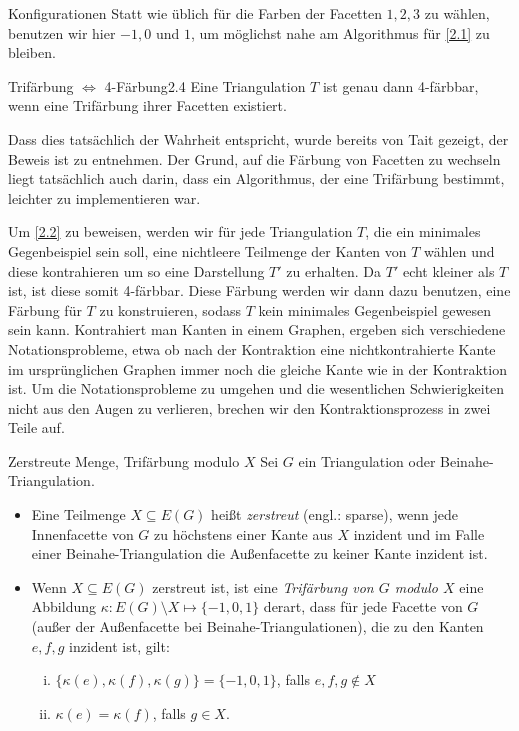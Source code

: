 \begin{section}{Konfigurationen}
 Statt wie üblich für die Farben der Facetten $1,2,3$ zu wählen, benutzen wir hier $-1,0$ und $1$, um möglichst nahe am Algorithmus für \ref{2.1} zu bleiben.
 
 \begin{satzl}{Trifärbung $\Leftrightarrow$ 4-Färbung}{2.4}
  Eine Triangulation $T$ ist genau dann 4-färbbar, wenn eine Trifärbung ihrer Facetten existiert.
 \end{satzl}
 
 Dass dies tatsächlich der Wahrheit entspricht, wurde bereits von Tait gezeigt, der Beweis ist \cite{TaitTri} zu entnehmen. Der Grund, auf die Färbung von Facetten zu wechseln liegt tatsächlich auch darin, dass ein Algorithmus, der eine Trifärbung bestimmt, leichter zu implementieren war. \cite[Seite 7]{FourRSST} 
 
 Um \ref{2.2} zu beweisen, werden wir für jede Triangulation $T$, die ein minimales Gegenbeispiel sein soll, eine nichtleere Teilmenge der Kanten von $T$ wählen und diese kontrahieren um so eine Darstellung $T'$ zu erhalten. Da $T'$ echt kleiner als $T$ ist, ist diese somit 4-färbbar. Diese Färbung werden wir dann dazu benutzen, eine Färbung für $T$ zu konstruieren, sodass $T$ kein minimales Gegenbeispiel gewesen sein kann. Kontrahiert man Kanten in einem Graphen, ergeben sich verschiedene Notationsprobleme, etwa ob nach der Kontraktion eine nichtkontrahierte Kante im ursprünglichen Graphen immer noch die gleiche Kante wie in der Kontraktion ist. Um die Notationsprobleme zu umgehen und die wesentlichen Schwierigkeiten nicht aus den Augen zu verlieren, brechen wir den Kontraktionsprozess in zwei Teile auf. 
 
 \begin{definition}{Zerstreute Menge, Trifärbung modulo $X$}
 Sei $G$ ein Triangulation oder Beinahe-Triangulation. 
 \begin{itemize}
  \item Eine Teilmenge $X \subseteq E(G)$ heißt \textit{zerstreut} (engl.: sparse), wenn jede Innenfacette von $G$ zu höchstens einer Kante aus $X$ inzident und im Falle einer Beinahe-Triangulation die Außenfacette zu keiner Kante inzident ist.
  \item Wenn $X \subseteq E(G)$ zerstreut ist, ist eine \textit{Trifärbung von $G$ modulo $X$} eine Abbildung $\kappa: E(G) \setminus X \mapsto \{-1,0,1\}$ derart, dass für jede Facette von $G$ (außer der Außenfacette bei Beinahe-Triangulationen), die zu den Kanten $e,f,g$ inzident ist, gilt:
  \begin{enumerate}[(i)]
   \item $\{\kappa(e),\kappa(f),\kappa(g)\} = \{-1,0,1\}$, falls $e,f,g \not\in X$
   \item $\kappa(e) = \kappa(f)$, falls $g\in X$.
  \end{enumerate}
 \end{itemize}
 \end{definition}
 

\end{section}
